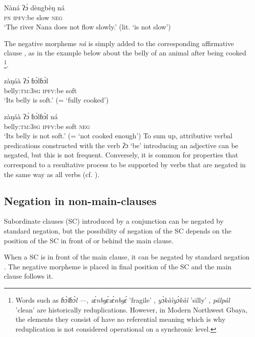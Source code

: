 \documentclass[output=paper,colorlinks=true, citecolor=brown]{langscibook}
\begin{document}
\ea\label{ex:gba:17}
    \gll Nàná ʔɔ́ dèngbèŋ ná \\ 
           \textsc{pn} \textsc{ipfv:}be slow \textsc{neg} \\
    \glt ‘The river Nana does not flow slowly.’ (lit. ‘is not slow’)
\z 

The negative morpheme \textit{ná} is simply added to the corresponding affirmative clause , as in the example below about the belly of an animal after being cooked \footnote{Words such as  \textit{ɓɔ̀lɓɔ̀l} ---, \textit{zɛ́nbgɛ́zɛ́nbgɛ́} 'fragile' , \textit{yɔ̀kàìyɔ̀kàì} 'silly' , \textit{pálpál} 'clean'  are historically reduplications. However, in Modern Northwest Gbaya, the elements they consist of have no referential meaning which is why reduplication is not considered operational on a synchronic level.}.

\ea\label{ex:gba:18}
    \gll  zàŋáà ʔɔ́ ɓɔ̀lɓɔ̀l \\ 
           belly:\textsc{tm}:3\textsc{sg} \textsc{ipfv}:be soft  \\
    \glt ‘Its belly is soft.’ (= ‘fully cooked’) 
\z 

\ea\label{ex:gba:19}
    \gll zàŋáà ʔɔ́ ɓɔ̀lɓɔ̀l ná \\ 
         belly:\textsc{tm}:3\textsc{sg} \textsc{ipfv}:be soft \textsc{neg} \\
    \glt ‘Its belly is not soft.’ (= ‘not cooked enough’)
\z 
To sum up, attributive verbal predications constructed with the verb \textit{ʔɔ} ‘be’ introducing an adjective can be negated, but this is not frequent. Conversely, it is common for properties that correspond to a resultative process to be supported by verbs that are negated in the same way as all verbs (cf. ).


\subsection{Negation in non-main-clauses}\label{sec:gba:2.4}

Subordinate clauses (SC) introduced by a conjunction can be negated by standard negation, but the possibility of negation of the SC depends on the position of the SC in front of or behind the main clause.

When a SC is in front of the main clause, it can be negated by standard negation . The negative morpheme is placed in final position of the SC and the main clause follows it. 
\end{document}
